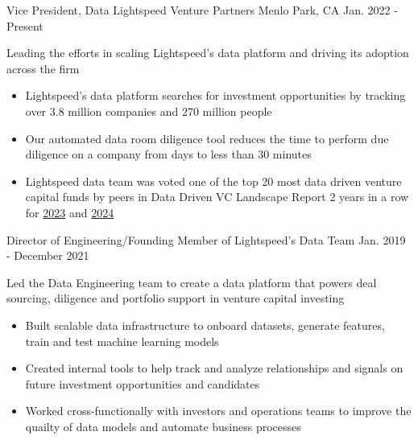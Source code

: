 

\begin{cventries}

  \cventry
  {Vice President, Data} %
  {Lightspeed Venture Partners} %
  {Menlo Park, CA} %
  {Jan. 2022 - Present} %
  {
    \begin{cvitems} %
      \item{Leading the efforts in scaling Lightspeed's data platform and driving its adoption across the firm}
      \begin{itemize}[label=$\circ$]
        \item{Lightspeed's data platform searches for investment opportunities by tracking over 3.8 million companies and 270 million people}
        \item{Our automated data room diligence tool reduces the time to perform due diligence on a company from days to less than 30 minutes}
        \item{Lightspeed data team was voted one of the top 20 most data driven venture capital funds by peers in Data Driven VC Landscape Report 2 years in a row for \href{https://achieved-sundae-b6a.notion.site/396dbcf2c80741e4b780e1149a808118?v=59af384c892049a8842136020ec1d425}{2023} and \href{https://fascinated-tumble-8a8.notion.site/89d3e96de7be4f82b6d52205cb7bdbfe?v=a79ddf8cef5645c5bf72d3f6fc05dde4}{2024}}
      \end{itemize}
    \end{cvitems}
  }

  \cventry
  {Director of Engineering/Founding Member of Lightspeed's Data Team} %
  {} %
  {} %
  {Jan. 2019 - December 2021} %
  {
    \begin{cvitems} %
      \item{Led the Data Engineering team to create a data platform that powers deal sourcing, diligence and portfolio support in venture capital investing}
      \begin{itemize}[label=$\circ$]
        \item{Built scalable data infrastructure to onboard datasets, generate features, train and test machine learning models}
        \item{Created internal tools to help track and analyze relationships and signals on future investment opportunities and candidates}
        \item{Worked cross-functionally with investors and operations teams to improve the quailty of data models and automate business processes}
      \end{itemize}
    \end{cvitems}
  }


\end{cventries}
